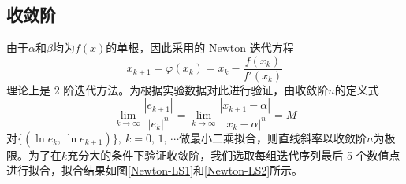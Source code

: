 \documentclass[11pt]{article}
\begin{document}
\subsection{收敛阶}
由于$\alpha$和$\beta$均为$f(x)$的单根，因此采用的 Newton 迭代方程
\begin{equation}
    x_{k + 1} = \varphi(x_k) = x_k - \frac{f(x_k)}{f'(x_k)} \label{6} \tag{6}
\end{equation}
理论上是 2 阶迭代方法。为根据实验数据对此进行验证，由收敛阶$n$的定义式
\begin{equation*}
    \lim_{k \rightarrow \infty}{\frac{\left|e_{k + 1}\right|}{\left|e_{k}\right|^n}} = \lim_{k \rightarrow \infty}{\frac{\left|x_{k + 1} - \alpha \right|}{\left|x_k - \alpha \right|^n}} = M
\end{equation*}
对$\{(\ln{e_{k}},\, \ln{e_{k + 1}})\},\ k = 0,\, 1,\, \cdots$做最小二乘拟合，则直线斜率以收敛阶$n$为极限\cite{数值方法计算弦截法的收敛阶}。为了在$k$充分大的条件下验证收敛阶，我们选取每组迭代序列最后 5 个数值点进行拟合，拟合结果如图\ref{Newton-LS1}和\ref{Newton-LS2}所示。
\end{document}
